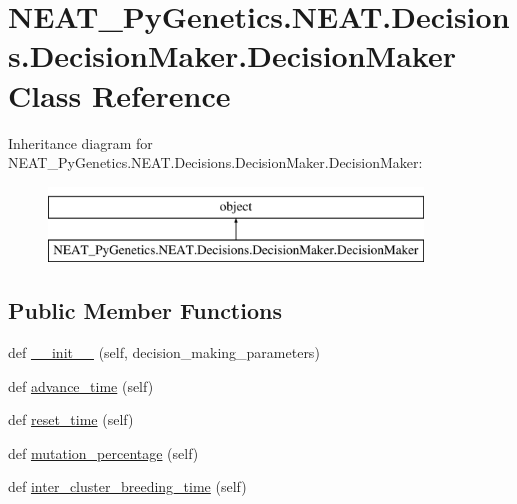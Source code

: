 \hypertarget{classNEAT__PyGenetics_1_1NEAT_1_1Decisions_1_1DecisionMaker_1_1DecisionMaker}{}\section{N\+E\+A\+T\+\_\+\+Py\+Genetics.\+N\+E\+A\+T.\+Decisions.\+Decision\+Maker.\+Decision\+Maker Class Reference}
\label{classNEAT__PyGenetics_1_1NEAT_1_1Decisions_1_1DecisionMaker_1_1DecisionMaker}
Inheritance diagram for N\+E\+A\+T\+\_\+\+Py\+Genetics.\+N\+E\+A\+T.\+Decisions.\+Decision\+Maker.\+Decision\+Maker\+:\begin{figure}[H]
\begin{center}
\leavevmode
\includegraphics[height=2.000000cm]{classNEAT__PyGenetics_1_1NEAT_1_1Decisions_1_1DecisionMaker_1_1DecisionMaker}
\end{center}
\end{figure}
\subsection*{Public Member Functions}
\begin{DoxyCompactItemize}
\item 
def \hyperlink{classNEAT__PyGenetics_1_1NEAT_1_1Decisions_1_1DecisionMaker_1_1DecisionMaker_a7691e28dc58fcd50858edcbf206c5bd9}{\+\_\+\+\_\+init\+\_\+\+\_\+} (self, decision\+\_\+making\+\_\+parameters)
\item 
def \hyperlink{classNEAT__PyGenetics_1_1NEAT_1_1Decisions_1_1DecisionMaker_1_1DecisionMaker_aee1f2396d8dfe5fd8e47f86bf6ffdb84}{advance\+\_\+time} (self)
\item 
def \hyperlink{classNEAT__PyGenetics_1_1NEAT_1_1Decisions_1_1DecisionMaker_1_1DecisionMaker_a18ac18ed4d2954404ea8b58e45b2f176}{reset\+\_\+time} (self)
\item 
def \hyperlink{classNEAT__PyGenetics_1_1NEAT_1_1Decisions_1_1DecisionMaker_1_1DecisionMaker_ac441f750aa9b1853744bf49b5e195249}{mutation\+\_\+percentage} (self)
\item 
def \hyperlink{classNEAT__PyGenetics_1_1NEAT_1_1Decisions_1_1DecisionMaker_1_1DecisionMaker_ab7cf16b4c29f75b24dec3c6f887b1cea}{inter\+\_\+cluster\+\_\+breeding\+\_\+time} (self)
\end{DoxyCompactItemize}


